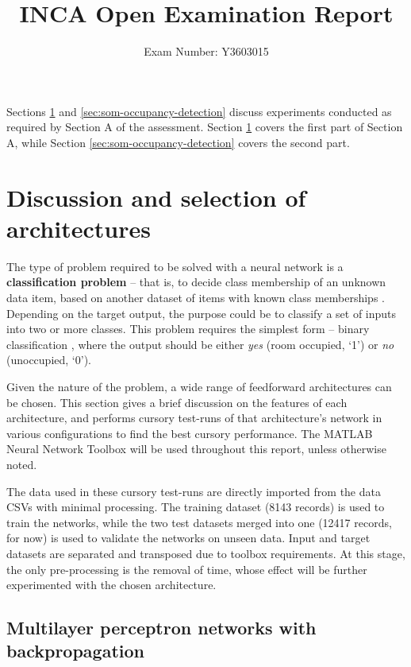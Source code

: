 \documentclass[10pt, oneside]{article}
\title{\vspace{-1.6cm}INCA Open Examination Report}
\author{Exam Number: Y3603015}
\date{}
\begin{document}
\maketitle

Sections \ref{sec:architectures} and \ref{sec:som-occupancy-detection} discuss experiments conducted as required by Section A of the assessment. Section \ref{sec:architectures} covers the first part of Section A, while Section \ref{sec:som-occupancy-detection} covers the second part.

\section{Discussion and selection of architectures} \label{sec:architectures}
The type of problem required to be solved with a neural network is a \textbf{classification problem} -- that is, to decide class membership of an unknown data item, based on another dataset of items with known class memberships \cite[Sec. 2]{Dreiseitl2002352}. Depending on the target output, the purpose could be to classify a set of inputs into two or more classes. This problem requires the simplest form -- binary classification \cite[Fig. 4]{candanedo2016accurate}, where the output should be either \textit{yes} (room occupied, `1') or \textit{no} (unoccupied, `0'). 

Given the nature of the problem, a wide range of feedforward architectures can be chosen. This section gives a brief discussion on the features of each architecture, and performs cursory test-runs of that architecture's network in various configurations to find the best cursory performance. The MATLAB Neural Network Toolbox \cite{kohonen2014matlab} will be used throughout this report, unless otherwise noted.

The data used in these cursory test-runs are directly imported from the data CSVs with minimal processing. The training dataset (8143 records) is used to train the networks, while the two test datasets merged into one (12417 records, for now) is used to validate the networks on unseen data. Input and target datasets are separated and transposed due to toolbox requirements. At this stage, the only pre-processing is the removal of time, whose effect will be further experimented with the chosen architecture.

\subsection{Multilayer perceptron networks with backpropagation} \label{subsec:mlp-test}
\end{document}
